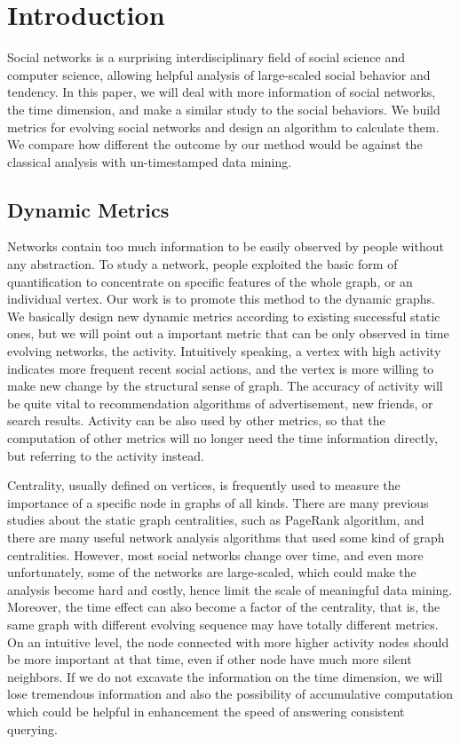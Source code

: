 \documentclass[12pt,abstract=true]{scrartcl}
\numberwithin{equation}{section}
\theoremstyle{definition}   \newtheorem{definition}{Definition}[section]
\theoremstyle{plain}        \newtheorem{theorem}{Theorem}[section]
\theoremstyle{plain}        \newtheorem{observation}{Observation}[section]
\theoremstyle{plain}        \newtheorem{fact}{Fact}[section]
\theoremstyle{plain}        \newtheorem{claim}{Claim}[section]
\theoremstyle{plain}        \newtheorem{lemma}[theorem]{Lemma}
\theoremstyle{plain}        \newtheorem{corollary}[theorem]{Corollary}
\theoremstyle{remark}       \newtheorem{example}{Example}[section]
\theoremstyle{remark}       \newtheorem{remark}{Remark}[section]
\begin{document}
\section{Introduction}
Social networks is a surprising interdisciplinary field of social science and
computer science, allowing helpful analysis of large-scaled social behavior
and tendency. In this paper, we will deal with more information of social
networks, the time dimension, and make a similar study to the social behaviors.
We build metrics for evolving social networks and design an algorithm to
calculate them. We compare how different the outcome by our method would be
against the classical analysis with un-timestamped data mining.

\subsection{Dynamic Metrics}
Networks contain too much information to be easily observed by people without
any abstraction. To study a network, people exploited the basic form of
quantification to concentrate on specific features of the whole graph, or an
individual vertex. Our work is to promote this method to the dynamic graphs. We
basically design new dynamic metrics according to existing successful static
ones, but we will point out a important metric that can be only observed in
time evolving networks, the activity. Intuitively speaking, a vertex with high
activity indicates more frequent recent social actions, and the vertex is more
willing to make new change by the structural sense of graph.  The accuracy of
activity will be quite vital to recommendation algorithms of advertisement, new
friends, or search results. Activity can be also used by other metrics, so that
the computation of other metrics will no longer need the time information
directly, but referring to the activity instead.

Centrality, usually defined on vertices, is frequently used to measure the
importance of a specific node in graphs of all kinds. There are many previous
studies about the static graph centralities\cite{newman2010networks}, such as
PageRank algorithm\cite{page1999pagerank}, and there are many useful network
analysis algorithms that used some kind of graph centralities. However, most
social networks change over time, and even more unfortunately, some of the
networks are large-scaled, which could make the analysis become hard and
costly, hence limit the scale of meaningful data mining. Moreover, the time
effect can also become a factor of the centrality, that is, the same graph with
different evolving sequence may have totally different metrics. On an intuitive
level, the node connected with more higher activity nodes should be more
important at that time, even if other node have much more silent neighbors. If
we do not excavate the information on the time dimension, we will lose
tremendous information and also the possibility of accumulative computation
which could be helpful in enhancement the speed of answering consistent
querying.
\end{document}
